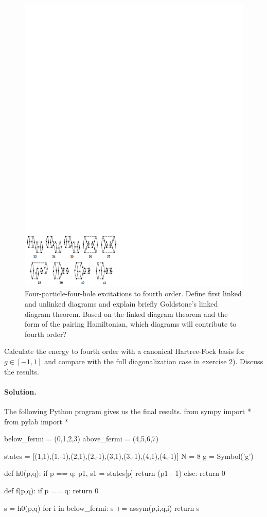 \documentclass[%
twoside,                 %
final,                   %
10pt]{article}
\newenvironment{doconceexercise}{}{}
\begin{document}
\begin{doconceexercise}
\begin{figure}[t]
  \centerline{\includegraphics[width=0.6\linewidth]{fig-proj/4p4h.pdf}}
  \caption{
  Four-particle-four-hole excitations to fourth order. \label{fig:fourthorder4p4h} Define first linked and unlinked diagrams and explain briefly Goldstone's linked diagram theorem. Based on the linked diagram theorem and the form of the pairing Hamiltonian, which diagrams will contribute to fourth order?
  }
\end{figure}


Calculate the energy to fourth order with a canonical Hartree-Fock basis for $g\in [-1,1]$ and compare
with the full diagonalization case in exercise 2). Discuss the results.


\paragraph{Solution.}
The following Python program gives us the final results.
\bpypro
from sympy import *
from pylab import *

below_fermi = (0,1,2,3)
above_fermi = (4,5,6,7)

states = [(1,1),(1,-1),(2,1),(2,-1),(3,1),(3,-1),(4,1),(4,-1)]
N = 8
g = Symbol('g')



def h0(p,q):
	if p == q:
		p1, s1 = states[p]
		return (p1 - 1)	
	else:
		return 0

def f(p,q):
	if p == q:
		return 0

	s = h0(p,q)
	for i in below_fermi:
		s += assym(p,i,q,i)
	return s



\end{doconceexercise}
\end{document}
